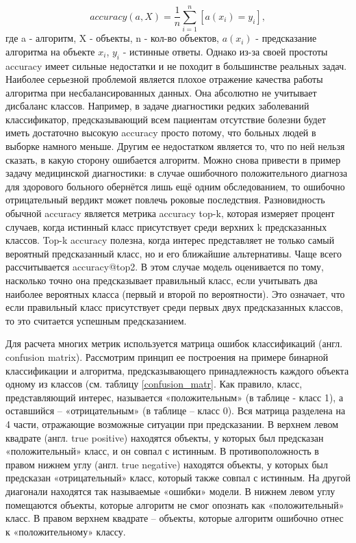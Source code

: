 \documentclass[a4paper,12pt]{extarticle}
\begin{document}
\begin{equation}
	\label{acc}
	accuracy(a, X) = \frac{1}{n}\sum_{i=1}^{n}[a(x_i)=y_i],
\end{equation}
где a - алгоритм, X - объекты, n - кол-во объектов,	$a(x_i)$ - предсказание алгоритма на объекте $x_i$,	$y_i$ - истинные ответы. Однако из-за своей простоты accuracy имеет сильные недостатки и не походит в большинстве реальных задач. Наиболее серьезной проблемой является плохое отражение качества работы алгоритма при несбалансированных данных. Она абсолютно не учитывает дисбаланс классов. Например, в задаче диагностики редких заболеваний классификатор, предсказывающий всем пациентам отсутствие болезни будет иметь достаточно высокую accuracy просто потому, что больных людей в выборке намного меньше. Другим ее недостатком является то, что по ней нельзя сказать, в какую сторону ошибается алгоритм. Можно снова привести в пример задачу медицинской диагностики: в случае ошибочного положительного диагноза для здорового больного обернётся лишь ещё одним обследованием, то ошибочно отрицательный вердикт может повлечь роковые последствия. Разновидность обычной accuracy является метрика accuracy top-k, которая измеряет процент случаев, когда истинный класс присутствует среди верхних k предсказанных классов. Top-k accuracy полезна, когда интерес представляет не только самый вероятный предсказанный класс, но и его ближайшие альтернативы. Чаще всего рассчитывается accuracy@top2. В этом случае модель оценивается по тому, насколько точно она предсказывает правильный класс, если учитывать два наиболее вероятных класса (первый и второй по вероятности). Это означает, что если правильный класс присутствует среди первых двух предсказанных классов, то это считается успешным предсказанием.

Для расчета многих метрик используется матрица ошибок классификаций (англ. confusion matrix). Рассмотрим принцип ее построения на примере бинарной классификации и алгоритма, предсказывающего принадлежность каждого объекта одному из классов (см. таблицу \ref{confusion_matr}. Как правило, класс, представляющий интерес, называется «положительным» (в таблице - класс 1), а оставшийся – «отрицательным» (в таблице – класс 0). Вся матрица разделена на 4 части, отражающие возможные ситуации при предсказании. В верхнем левом квадрате (англ. true positive) находятся объекты, у которых был предсказан «положительный» класс, и он совпал с истинным. В противоположность в правом нижнем углу (англ. true negative) находятся объекты, у которых был предсказан «отрицательный» класс, который также совпал с истинным. На другой диагонали находятся так называемые «ошибки» модели. В нижнем левом углу помещаются объекты, которые алгоритм не смог опознать как «положительный» класс. В правом верхнем квадрате – объекты, которые алгоритм ошибочно отнес к «положительному» классу.
\end{document}
